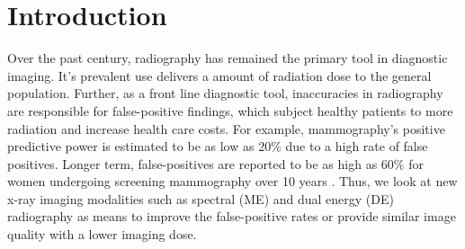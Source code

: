 \documentclass[a4paper,11pt]{article}
\begin{document}
\maketitle
%


\section{Introduction}

Over the past century, radiography has remained the primary tool in diagnostic imaging. It's prevalent use delivers a amount of radiation dose to the general population. Further, as a front line diagnostic tool, inaccuracies in radiography are responsible for false-positive findings, which subject healthy patients to more radiation and increase health care costs. For example, mammography's positive predictive power is estimated to be as low as 20\% \cite{Skaane2013ProspectiveArbitration., Dickersin2010TheCancer, Kopans1992TheMammography., Mushlin1998EstimatingMeta-analysis, Chiarelli2013DigitalProgram} due to a high rate of false positives. Longer term, false-positives are reported to be as high as 60\% for women undergoing screening mammography over 10 years \cite{Kerlikowske2013OutcomesTherapy, Hubbard2011CumulativeMammography}. Thus, we look at new x-ray imaging modalities such as spectral (ME) and dual energy (DE) radiography as means to improve the false-positive rates or provide similar image quality with a lower imaging dose.

\end{document}
